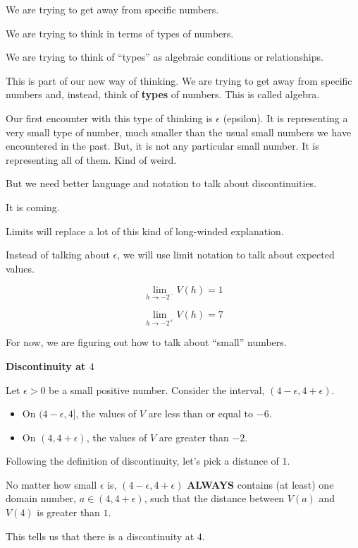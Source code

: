 \documentclass{ximera}
\begin{document}
\begin{idea}


We are trying to get away from specific numbers. 

We are trying to think in terms of types of numbers. 

We are trying to think of ``types'' as algebraic conditions or relationships. 


This is part of our new way of thinking.  We are trying to get away from specific numbers and, instead, think of \textbf{types} of numbers.  This is called algebra.

Our first encounter with this type of thinking is $\epsilon$ (epsilon).  It is representing a very small type of number, much smaller than the usual small numbers we have encountered in the past.  But, it is not any particular small number.  It is representing all of them. Kind of weird. 


But we need better language and notation to talk about discontinuities. 

It is coming. 

Limits will replace a lot of this kind of long-winded explanation. 

Instead of talking about $\epsilon$, we will use limit notation to talk about expected values. 



\[
\lim\limits_{h \to -2^-} V(h) = 1
\]


\[
\lim\limits_{h \to -2^+} V(h) = 7
\]

For now, we are figuring out how to talk about ``small'' numbers. 

\end{idea}









\begin{explanation} \textbf{\textcolor{red!75!green}{Discontinuity at $4$}}  


Let $\epsilon > 0$ be a small positive number.  Consider the interval, $(4 - \epsilon, 4 + \epsilon)$.

\begin{itemize}
\item On $(4 - \epsilon, 4]$, the values of $V$ are less than or equal to $-6$.
\item On $(4, 4 + \epsilon)$, the values of $V$ are greater than $-2$.
\end{itemize}


Following the definition of discontinuity, let's pick a distance of $1$.


No matter how small $\epsilon$ is, $(4 - \epsilon, 4 + \epsilon)$ \textbf{\textcolor{red!70!darkgray}{ALWAYS}} contains (at least) one domain number, $a \in (4, 4 + \epsilon)$, such that the distance between $V(a)$ and $V(4)$ is greater than $1$.

This tells us that there is a discontinuity at $4$.

\end{explanation}
\end{document}

